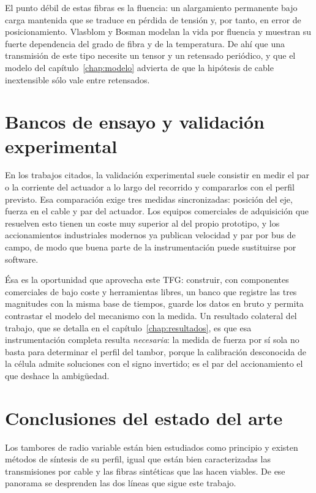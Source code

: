 El punto débil de estas fibras es la fluencia: un alargamiento permanente bajo carga mantenida que
se traduce en pérdida de tensión y, por tanto, en error de posicionamiento. Vlasblom y Bosman
\cite{vlasblom2006} modelan la vida por fluencia y muestran su fuerte dependencia del grado de fibra
y de la temperatura. De ahí que una transmisión de este tipo necesite un tensor y un retensado
periódico, y que el modelo del capítulo~\ref{chap:modelo} advierta de que la hipótesis de cable
inextensible sólo vale entre retensados.

\section{Bancos de ensayo y validación experimental}

En los trabajos citados, la validación experimental suele consistir en medir el par o la corriente
del actuador a lo largo del recorrido y compararlos con el perfil previsto. Esa comparación exige
tres medidas sincronizadas: posición del eje, fuerza en el cable y par del actuador. Los equipos
comerciales de adquisición que resuelven esto tienen un coste muy superior al del propio prototipo,
y los accionamientos industriales modernos ya publican velocidad y par por bus de campo, de modo que
buena parte de la instrumentación puede sustituirse por software.

Ésa es la oportunidad que aprovecha este TFG: construir, con componentes comerciales de bajo coste y
herramientas libres, un banco que registre las tres magnitudes con la misma base de tiempos, guarde
los datos en bruto y permita contrastar el modelo del mecanismo con la medida. Un resultado
colateral del trabajo, que se detalla en el capítulo~\ref{chap:resultados}, es que esa
instrumentación completa resulta \emph{necesaria}: la medida de fuerza por sí sola no basta para
determinar el perfil del tambor, porque la calibración desconocida de la célula admite soluciones
con el signo invertido; es el par del accionamiento el que deshace la ambigüedad.

\section{Conclusiones del estado del arte}

Los tambores de radio variable están bien estudiados como principio y existen métodos de síntesis de
su perfil, igual que están bien caracterizadas las transmisiones por cable y las fibras sintéticas
que las hacen viables. De ese panorama se desprenden las dos líneas que sigue este trabajo.

